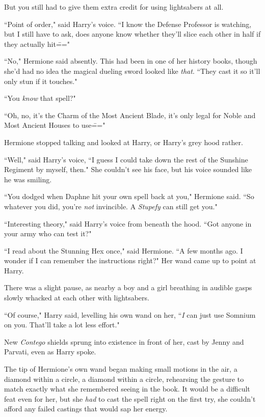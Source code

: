 But you still had to give them extra credit for using lightsabers at all.

``Point of order," said Harry's voice. ``I know the Defense Professor is watching, but I still have to ask, does anyone know whether they'll slice each other in half if they actually hit\==="

``No," Hermione said absently. This had been in one of her history books, though she'd had no idea the magical dueling sword looked like \emph{that}. ``They cast it so it'll only stun if it touches."

``You \emph{know} that spell?"

``Oh, no, it's the Charm of the Most Ancient Blade, it's only legal for Noble and Most Ancient Houses to use\==="

Hermione stopped talking and looked at Harry, or Harry's grey hood rather.

``Well," said Harry's voice, ``I guess I could take down the rest of the Sunshine Regiment by myself, then." She couldn't see his face, but his voice sounded like he was smiling.

``You dodged when Daphne hit your own spell back at you," Hermione said. ``So whatever you did, you're \emph{not} invincible. A \emph{Stupefy} can still get you."

``Interesting theory," said Harry's voice from beneath the hood. ``Got anyone in your army who can test it?"

``I read about the Stunning Hex once," said Hermione. ``A few months ago. I wonder if I can remember the instructions right?" Her wand came up to point at Harry.

There was a slight pause, as nearby a boy and a girl breathing in audible gasps slowly whacked at each other with lightsabers.

``Of course," Harry said, levelling his own wand on her, ``\emph{I} can just use Somnium on you. That'll take a lot less effort."

New \emph{Contego} shields sprung into existence in front of her, cast by Jenny and Parvati, even as Harry spoke.

The tip of Hermione's own wand began making small motions in the air, a diamond within a circle, a diamond within a circle, rehearsing the gesture to match exactly what she remembered seeing in the book. It would be a difficult feat even for her, but she \emph{had} to cast the spell right on the first try, she couldn't afford any failed castings that would sap her energy.

